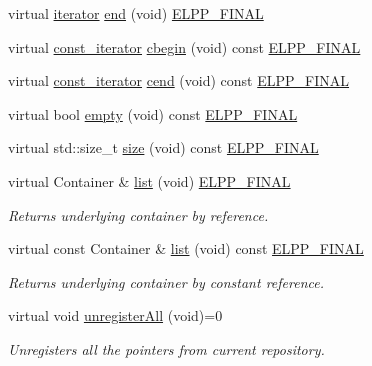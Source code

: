\begin{DoxyCompactItemize}
\item 
virtual \hyperlink{classel_1_1base_1_1utils_1_1_abstract_registry_a58d0536c748633afd3f7c237b63a9a7c}{iterator} \hyperlink{classel_1_1base_1_1utils_1_1_abstract_registry_a67c40207c171f23ad50a71db819e84f9}{end} (void) \hyperlink{easylogging_09_09_8h_a2f812449f8d3355cf5b03ceb2ee5021b}{E\+L\+P\+P\+\_\+\+F\+I\+N\+A\+L}
\item 
virtual \hyperlink{classel_1_1base_1_1utils_1_1_abstract_registry_a3bbf19b112c067cb1a02a82b003cc7e2}{const\+\_\+iterator} \hyperlink{classel_1_1base_1_1utils_1_1_abstract_registry_a37f743184e808d7c0028e21e0d0898bb}{cbegin} (void) const \hyperlink{easylogging_09_09_8h_a2f812449f8d3355cf5b03ceb2ee5021b}{E\+L\+P\+P\+\_\+\+F\+I\+N\+A\+L}
\item 
virtual \hyperlink{classel_1_1base_1_1utils_1_1_abstract_registry_a3bbf19b112c067cb1a02a82b003cc7e2}{const\+\_\+iterator} \hyperlink{classel_1_1base_1_1utils_1_1_abstract_registry_ad3ee081b4b25c5d77f971f949bdb9158}{cend} (void) const \hyperlink{easylogging_09_09_8h_a2f812449f8d3355cf5b03ceb2ee5021b}{E\+L\+P\+P\+\_\+\+F\+I\+N\+A\+L}
\item 
virtual bool \hyperlink{classel_1_1base_1_1utils_1_1_abstract_registry_a43ff6484b778c298416c482c07a4df3f}{empty} (void) const \hyperlink{easylogging_09_09_8h_a2f812449f8d3355cf5b03ceb2ee5021b}{E\+L\+P\+P\+\_\+\+F\+I\+N\+A\+L}
\item 
virtual std\+::size\+\_\+t \hyperlink{classel_1_1base_1_1utils_1_1_abstract_registry_a58a7b8ea964bdf6008701dcfb6609ca5}{size} (void) const \hyperlink{easylogging_09_09_8h_a2f812449f8d3355cf5b03ceb2ee5021b}{E\+L\+P\+P\+\_\+\+F\+I\+N\+A\+L}
\item 
virtual Container \& \hyperlink{classel_1_1base_1_1utils_1_1_abstract_registry_a072859d3728a75f910c2898f62fd12da}{list} (void) \hyperlink{easylogging_09_09_8h_a2f812449f8d3355cf5b03ceb2ee5021b}{E\+L\+P\+P\+\_\+\+F\+I\+N\+A\+L}
\begin{DoxyCompactList}\small\item\em Returns underlying container by reference. \end{DoxyCompactList}\item 
virtual const Container \& \hyperlink{classel_1_1base_1_1utils_1_1_abstract_registry_a1c3da2af9177cbfae6f10b9e5dbe615c}{list} (void) const \hyperlink{easylogging_09_09_8h_a2f812449f8d3355cf5b03ceb2ee5021b}{E\+L\+P\+P\+\_\+\+F\+I\+N\+A\+L}
\begin{DoxyCompactList}\small\item\em Returns underlying container by constant reference. \end{DoxyCompactList}\item 
virtual void \hyperlink{classel_1_1base_1_1utils_1_1_abstract_registry_a19223bc1fea48dbe6b47b4879aa4672f}{unregister\+All} (void)=0
\begin{DoxyCompactList}\small\item\em Unregisters all the pointers from current repository. \end{DoxyCompactList}\end{DoxyCompactItemize}
